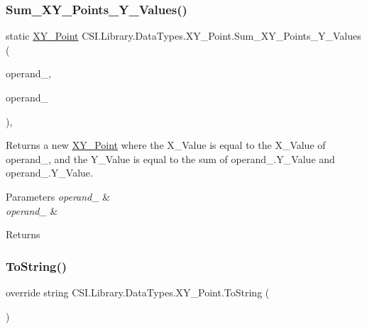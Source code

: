 \subsubsection{\texorpdfstring{Sum\_XY\_Points\_Y\_Values()}{Sum\_XY\_Points\_Y\_Values()}}
{\footnotesize\ttfamily static \mbox{\hyperlink{struct_c_s_i_1_1_library_1_1_data_types_1_1_x_y___point}{X\+Y\+\_\+\+Point}} C\+S\+I.\+Library.\+Data\+Types.\+X\+Y\+\_\+\+Point.\+Sum\+\_\+\+X\+Y\+\_\+\+Points\+\_\+\+Y\+\_\+\+Values (\begin{DoxyParamCaption}\item[{\mbox{\hyperlink{struct_c_s_i_1_1_library_1_1_data_types_1_1_x_y___point}{X\+Y\+\_\+\+Point}}}]{operand\+\_,  }\item[{\mbox{\hyperlink{struct_c_s_i_1_1_library_1_1_data_types_1_1_x_y___point}{X\+Y\+\_\+\+Point}}}]{operand\+\_ }\end{DoxyParamCaption})\hspace{0.3cm}{\ttfamily [inline]}, {\ttfamily [static]}}



Returns a new \mbox{\hyperlink{struct_c_s_i_1_1_library_1_1_data_types_1_1_x_y___point}{X\+Y\+\_\+\+Point}} where the X\+\_\+\+Value is equal to the X\+\_\+\+Value of operand\+\_, and the Y\+\_\+\+Value is equal to the sum of operand\+\_.\+Y\+\_\+\+Value and operand\+\_.\+Y\+\_\+\+Value. 


\begin{DoxyParams}{Parameters}
{\em operand\+\_} & \\
\hline
{\em operand\+\_} & \\
\hline
\end{DoxyParams}
\begin{DoxyReturn}{Returns}

\end{DoxyReturn}
\mbox{\label{struct_c_s_i_1_1_library_1_1_data_types_1_1_x_y___point_a01859cb5642dd98cb6bdc44b71d929ce}} 
\subsubsection{\texorpdfstring{ToString()}{ToString()}}
{\footnotesize\ttfamily override string C\+S\+I.\+Library.\+Data\+Types.\+X\+Y\+\_\+\+Point.\+To\+String (\begin{DoxyParamCaption}{ }\end{DoxyParamCaption})\hspace{0.3cm}{\ttfamily [inline]}}



